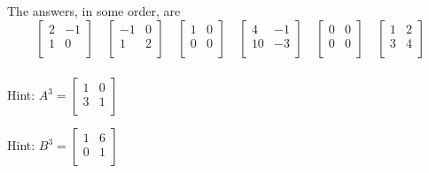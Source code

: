 \subsubsection*{ \answers}
The answers, in some order, are
$$ 
\left[ \begin{array}{rr} 2 & -1\\ 1 & 0 \\ \end{array} \right] \quad  %
\left[ \begin{array}{rr} -1 & 0\\ 1 & 2 \\ \end{array} \right] \quad %
\left[ \begin{array}{cc} 1 & 0\\ 0 & 0 \\ \end{array} \right] \quad %
\left[ \begin{array}{rr} 4 & -1\\ 10 & -3 \\ \end{array} \right] \quad %
\left[ \begin{array}{cc} 0 & 0\\ 0 & 0 \\ \end{array} \right] \quad %
\left[ \begin{array}{cc} 1 & 2\\ 3 & 4 \\ \end{array} \right] %
$$

\subsubsection*{ \answers}
\begin{apart}
    \item Hint: $A^3=\left[ \begin{array}{cc} 1 & 0 \\ 3 & 1 \\ \end{array} \right]$
    \item Hint: $B^3=\left[ \begin{array}{cc} 1 & 6 \\ 0 & 1 \\ \end{array} \right]$
\end{apart}

